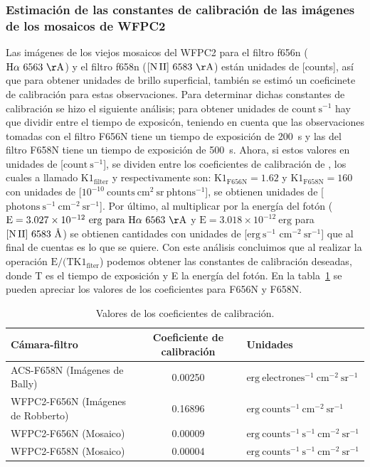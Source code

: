 \subsubsection{Estimación de las  constantes de calibración de las imágenes de los mosaicos de WFPC2}
\label{sec:wpfc2}
Las imágenes de los viejos mosaicos del WFPC2 para el filtro f656n (\(\mathrm{\ha~6563~\AA{}}\)) y el filtro f658n (\(\mathrm{\nii~6583~\AA{}}\)) están unidades de [counts], así que para obtener unidades de brillo superficial, también se estimó un coeficinete de calibración para estas observaciones. Para determinar dichas constantes de calibración se hizo el siguiente análisis; para obtener unidades de \(\mathrm{count~s^{-1}}\) hay que  dividir entre el tiempo de exposicón, teniendo en cuenta que las observaciones tomadas con el filtro F656N tiene un tiempo de exposición de 200~s y las del filtro F658N tiene un tiempo de exposición de 500~s. Ahora, si estos valores en unidades de [\(\mathrm{count~s^{-1}}\)], se dividen entre los coeficientes de calibración de \citet{Odell:2009}, los cuales a llamado \(\mathrm{K1_{filter}}\) y respectivamente son: \(\mathrm{K1_{F656N} = 1.62}\) y \(\mathrm{K1_{F658N} = 160}\) con unidades de [\(\mathrm{10^{-10}~counts~cm^{2}~sr~phtons^{-1}}\)], se obtienen unidades de [\(\mathrm{photons~s^{-1}~cm^{-2}~sr^{-1}}\)]. Por último, al multiplicar por la energía del fotón (\(\mathrm{E=3.027\times 10^{-12}~erg~para~\ha{}~6563~\AA{}}\) y \(\mathrm{E=3.018 \times10^{-12}~erg}\) para \(\mathrm{[N\,II]}{}~6583~\text{\AA{}}{}\)) se obtienen cantidades con unidades de [\(\mathrm{erg~s^{-1}}\)  \(\mathrm{cm^{-2}~sr^{-1}}\)] que al final de cuentas es lo que se quiere.  Con este análisis concluimos que al realizar la operación \(\text{E}/(\mathrm{TK1_{fiter}}\))  podemos obtener las constantes de calibración deseadas, donde T es el tiempo de exposición y E la energía del fotón. En la tabla~\ref{tab:table-constans} se pueden apreciar los valores de los coeficientes para F656N y F658N. 


\begin{table}[htp]
\centering
\small\raggedright
\renewcommand{\arraystretch}{1.5}
\caption{Valores de los coeficientes de calibración.}
  \label{tab:table-constans}

\begin{tabular}{ |l| |c| |l| }
\hline
Cámara-filtro&                       Coeficiente de calibración&       Unidades\\ \hline 
ACS-F658N (Imágenes de Bally)&       0.00250 &                          \(\mathrm{erg~electrones^{-1}~cm^{-2}~sr^{-1}}\)\\
WFPC2-F656N (Imágenes de Robberto)&  0.16896 &                          \(\mathrm{erg~counts^{-1}~cm^{-2}~sr^{-1}}\)\\
WFPC2-F656N (Mosaico)&               0.00009 &                          \(\mathrm{erg~counts^{-1}~s^{-1}~cm^{-2}~sr^{-1}}\)\\
WFPC2-F658N (Mosaico)&               0.00004 &                          \(\mathrm{erg~counts^{-1}~s^{-1}~cm^{-2}~sr^{-1}}\)\\ 
\hline
 \end{tabular} 
 \end{table}
\normalsize

